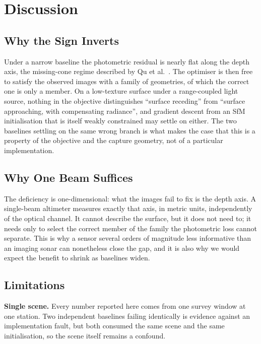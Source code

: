 \documentclass[conference]{IEEEtran}
\begin{document}
\section{Discussion}

\subsection{Why the Sign Inverts}

Under a narrow baseline the photometric residual is nearly flat along the depth
axis, the missing-cone regime described by Qu et al.\ \cite{qu2024zsplat}. The
optimiser is then free to satisfy the observed images with a family of
geometries, of which the correct one is only a member. On a low-texture surface
under a range-coupled light source, nothing in the objective distinguishes
``surface receding'' from ``surface approaching, with compensating radiance'',
and gradient descent from an SfM initialisation that is itself weakly
constrained may settle on either. The two baselines settling on the same wrong
branch is what makes the case that this is a property of the objective and the
capture geometry, not of a particular implementation.

\subsection{Why One Beam Suffices}

The deficiency is one-dimensional: what the images fail to fix is the depth
axis. A single-beam altimeter measures exactly that axis, in metric units,
independently of the optical channel. It cannot describe the surface, but it
does not need to; it needs only to select the correct member of the family the
photometric loss cannot separate. This is why a sensor several orders of
magnitude less informative than an imaging sonar
\cite{qadri2024aoneus, qu2024zsplat} can nonetheless close the gap, and it is
also why we would expect the benefit to shrink as baselines widen.

\subsection{Limitations}
\label{sec:limitations}

\textbf{Single scene.} Every number reported here comes from one survey
window at one station. Two independent baselines failing identically is
evidence against an implementation fault, but both consumed the same scene and
the same initialisation, so the scene itself remains a confound.
\end{document}

